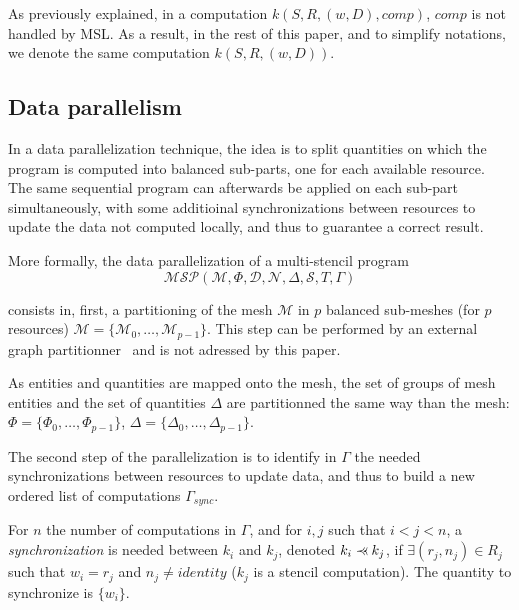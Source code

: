 As previously explained, in a computation $k(S,R,(w,D),comp)$, $comp$ is not handled by MSL. As a result, in the rest of this paper, and to simplify notations, we denote the same computation $k(S,R,(w,D))$.

\subsection{Data parallelism}
\label{sect:dataparal}
In a data parallelization technique, the idea is to split quantities on which the program is computed into balanced sub-parts, one for each available resource. The same sequential program can afterwards be applied on each sub-part simultaneously, with some additioinal synchronizations between resources to update the data not computed locally, and thus to guarantee a correct result.

\medskip
More formally, the data parallelization of a multi-stencil program 
\begin{equation*}
\mathcal{MSP}(\mathcal{M},\Phi,\mathcal{D},\mathcal{N},\Delta, \mathcal{S},T,\Gamma)
\end{equation*}

consists in, first, a partitioning of the mesh $\mathcal{M}$ in $p$ balanced sub-meshes (for $p$ resources) $\mathcal{M}=\{\mathcal{M}_0,\dots,\mathcal{M}_{p-1}\}$. This step can be performed by an external graph partitionner~\cite{} and is not adressed by this paper. 

As entities and quantities are mapped onto the mesh, the set of groups of mesh entities and the set of quantities $\Delta$ are partitionned the same way than the mesh: $\Phi=\{\Phi_0,\dots,\Phi_{p-1}\}$, $\Delta=\{\Delta_0,\dots,\Delta_{p-1}\}$. 

The second step of the parallelization is to identify in $\Gamma$ the needed synchronizations between resources to update data, and thus to build a new ordered list of computations $\Gamma_{sync}$.

\begin{mydef}
For $n$ the number of computations in $\Gamma$, and for $i,j$ such that $i<j<n$, a \textit{synchronization} is needed between $k_i$ and $k_j$, denoted $k_i \pprec k_j$, if $\exists (r_j,n_j) \in R_j$ such that $w_i=r_j$ and $n_j\neq identity$ ($k_j$ is a stencil computation). The quantity to synchronize is $\{w_i\}$.
\label{def:sync}
\end{mydef}

